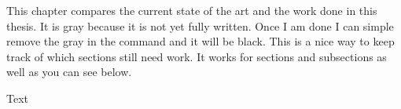 \documentclass[class=scrbook, crop=false]{standalone}
\begin{document}
\label{Chapter::State_of_the_Art} %
    This chapter compares the current state of the art and the work done in this thesis. It is gray because it is not yet fully written. Once I am done I can simple remove the gray in the command and it will be black. This is a nice way to keep track of which sections still need work. It works for sections and subsections as well as you can see below.

\label{Section::SotA_Topic}
    Text
\end{document}
